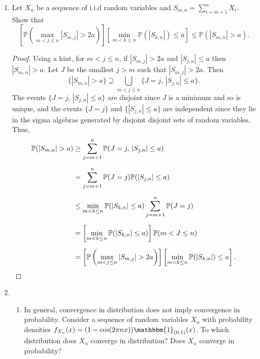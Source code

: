 \documentclass[11pt,oneside,english]{amsart}
\theoremstyle{definition}
\newcommand{\lspace}{\vspace{5mm}}
\newcommand{\1}{\mathbbm{1}}
\newcommand{\p}{\mathbb{P}}
\begin{document}
\rightline{\today}

\lspace




\begin{enumerate}[leftmargin=*]
\itemsep5mm


\item Let $X_n$ be a sequence of i.i.d random variables and $S_{m,n}=\sum_{i=m+1}^n X_i$. Show that
\[
\left[\p\left(\max_{m<j\leq n}|S_{m,j}|>2a\right)\right]\left[\min_{m<k\leq n}\p(|S_{k,n}|)\leq a\right]\leq \p(|S_{m,n}|>a).
\]

\begin{proof}
Using a hint, for $m< j\leq n$, if $|S_{m,j}|>2a$ and $|S_{j,n}| \leq a$ then $|S_{m,n}|> a$. Let $J$ be the smallest $j>m$ such that $|S_{m,j}|>2a$. Then
\[
\{|S_{m,n}|>a\}\supseteq \bigcup_{m<j\leq n}\{J=j,\,|S_{j,n}|\leq a\}.
\]
The events $\{J=j,\,|S_{j,n}|\leq a\}$ are disjoint since $J$ is a minimum and so is unique, and the events $\{J=j\}$ and $\{|S_{j,n}|\leq a\}$ are independent since they lie in the sigma algebras generated by disjoint disjoint sets of random variables. Thus,
\begin{align*}
\p(|S_{m,n}|>a)&\geq \sum_{j=m+1}^n\p(J=j,\,|S_{j,n}|\leq a)\\[2mm]
&=\sum_{j=m+1}^n\p(J=j)\p(|S_{j,n}|\leq a)\\[2mm]
&\leq \min_{m< k\leq n}\p(|S_{k,n}|\leq a)\sum_{j=m+1}^n\p(J=j)\\[2mm]
&=\left[\min_{m<k\leq n} \p(|S_{k,n}|\leq a)\right]\p(m<J\leq n)\\[2mm]
&=\left[\p\left(\max_{m<j\leq n}|S_{m,j}|>2a\right)\right]\left[\min_{m<k\leq n}\p(|S_{k,n}|)\leq a\right].\qedhere
\end{align*}
\end{proof}


\vfill
\pagebreak
















\item \begin{enumerate}\itemsep5mm \item In general, convergence in distribution does not imply convergence in probability. Consider a sequence of random variables $X_n$ with probability densities $f_{X_n}(x)=(1-\cos(2\pi nx))\1_{(0,1)}(x)$. To which distribution does $X_n$ converge in distribution? Does $X_n$ converge in probability?


\end{enumerate}
\end{enumerate}
\end{document}
